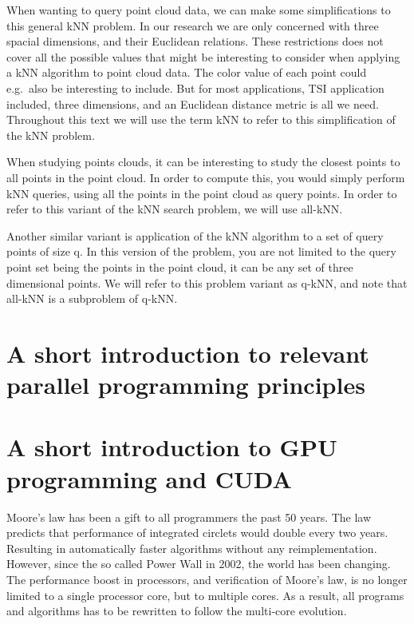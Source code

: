 When wanting to query point cloud data, we can make some simplifications to this general kNN problem. In our research we are only concerned with three spacial dimensions, and their Euclidean relations. These restrictions does not cover all the possible values that might be interesting to consider when applying a kNN algorithm to point cloud data. The color value of each point could e.g.\ also be interesting to include. But for most applications, TSI application included, three dimensions, and an Euclidean distance metric is all we need. Throughout this text we will use the term kNN to refer to this simplification of the kNN problem.

When studying points clouds, it can be interesting to study the closest points to all points in the point cloud. In order to compute this, you would simply perform kNN queries, using all the points in the point cloud as query points. In order to refer to this variant of the kNN search problem, we will use all-kNN\@.

Another similar variant is application of the kNN algorithm to a set of query points of size q. In this version of the problem, you are not limited to the query point set being the points in the point cloud, it can be any set of three dimensional points. We will refer to this problem variant as q-kNN, and note that all-kNN is a subproblem of q-kNN\@.

\section{A short introduction to relevant parallel programming principles} %
\label{sub:a_short_introduction_to_relevant_parallel_programming_principles}


\section{A short introduction to GPU programming and CUDA} %
\label{sub:a_short_introduction_to_gpu_programming_and_cuda}

Moore's law has been a gift to all programmers the past 50 years. The law predicts that performance of integrated circlets would double every two years. Resulting in automatically faster algorithms without any reimplementation. However, since the so called Power Wall in 2002, the world has been changing. The performance boost  in processors, and verification of Moore's law, is no longer limited to a single processor core, but to multiple cores. As a result, all programs and algorithms has to be rewritten to follow the multi-core evolution.

